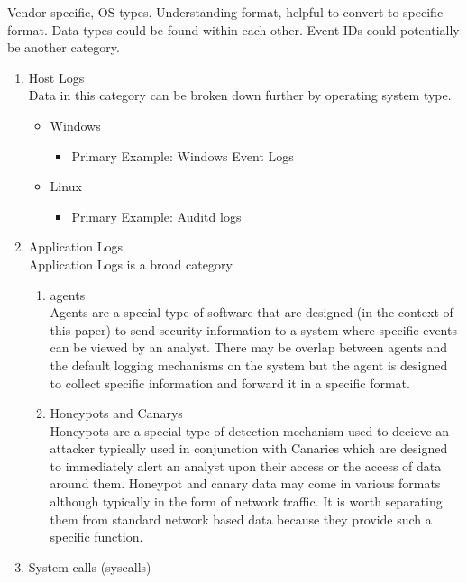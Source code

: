 \documentclass[conference]{IEEEtran}
\begin{document}
Vendor specific, OS types. Understanding format, helpful to convert to specific format. Data types could be found within each other. Event IDs could potentially be another category.
\begin{enumerate}
    \item Host Logs\cite{jia2017big}\cite{marchetti2016analysis}
    \\Data in this category can be broken down further by operating system type.
    \begin{itemize}
        \item Windows
        \begin{itemize}
            \item Primary Example: Windows Event Logs
        \end{itemize}
        \item Linux
        \begin{itemize}
            \item Primary Example: Auditd logs
        \end{itemize}
    \end{itemize}
    \item Application Logs\cite{giura2012context}\cite{ten2010cybersecurity}
    \\Application Logs is a broad category.
        \begin{enumerate}
            \item agents\cite{garcia2009anomaly}
            \\Agents are a special type of software that are designed (in the context of this paper) to send security information to a system where specific events can be viewed by an analyst. There may be overlap between agents and the default logging mechanisms on the system but the agent is designed to collect specific information and forward it in a specific format.
            \item Honeypots and Canarys\cite{jasek2013apt}
            \\Honeypots are a special type of detection mechanism used to decieve an attacker typically used in conjunction with Canaries which are designed to immediately alert an analyst upon their access or the access of data around them. Honeypot and canary data may come in various formats although typically in the form of network traffic. It is worth separating them from standard network based data because they provide such a specific function. 
        \end{enumerate}
    \item System calls (syscalls) \cite{warrender1999detecting}\cite{hofmeyr1998intrusion}

\end{enumerate}
\end{document}
